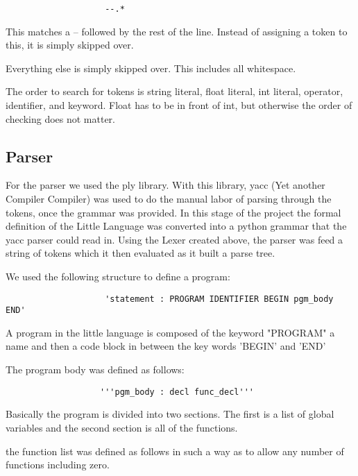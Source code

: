 \documentclass[12pt]{article}
\begin{document}
                \begin{verbatim}
                    --.*
                \end{verbatim}

                This matches a -- followed by the rest of the line. Instead of assigning a token to this, it is simply skipped over.

                Everything else is simply skipped over. This includes all whitespace.

                The order to search for tokens is string literal, float literal, int literal, operator, identifier, and keyword. Float has to be in front of int, but otherwise the order of checking does not matter.




    	\subsection{Parser}
    		For the parser we used the ply library.  With this library, yacc (Yet another Compiler Compiler) was used to do the manual labor of parsing through the tokens, once the grammar was provided.   In this stage of the project the formal definition of the Little Language was converted into a python grammar that the yacc parser could read in.  Using the Lexer created above, the parser was feed a string of tokens which it then evaluated as it built a parse tree.  
    		
    		We used the following structure to define a program: 
    		\begin{verbatim}
                    'statement : PROGRAM IDENTIFIER BEGIN pgm_body END'
           \end{verbatim}
           
           A program in the little language is composed of the keyword "PROGRAM" a name and then a code block in between the key words 'BEGIN' and 'END'
           
           The program body was defined as follows:
           \begin{verbatim}
                   '''pgm_body : decl func_decl'''
           \end{verbatim}
           
           Basically the program is divided into two sections.  The first is a list of global variables and the second section is all of the functions.
           
           the function list was defined as follows in such a way as to allow any number of functions including zero.
           
\end{document}
